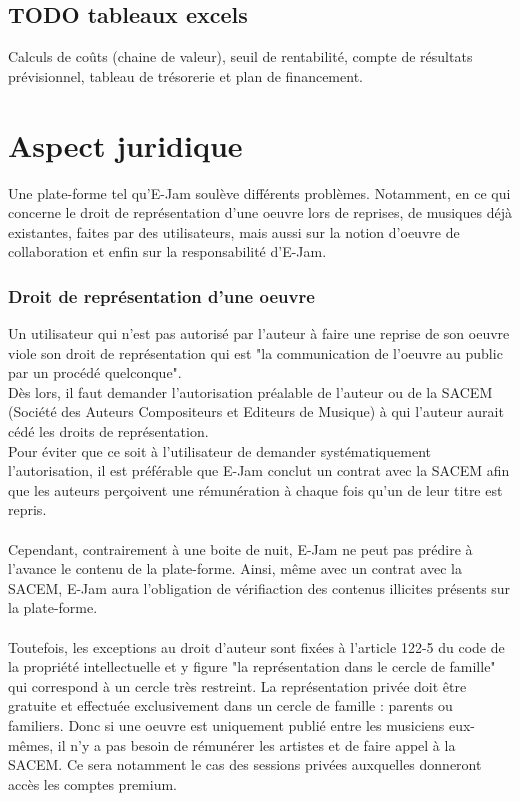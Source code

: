 \documentclass[a4,12pt]{article}
\begin{document}
\subsection{TODO tableaux excels}

Calculs de coûts (chaine de valeur), seuil de rentabilité, compte de résultats prévisionnel, tableau de trésorerie et plan de financement.\\

\section{Aspect juridique}
Une plate-forme tel qu'E-Jam soulève différents problèmes. Notamment, en ce qui concerne le droit de représentation d'une oeuvre lors de reprises, de musiques déjà existantes, faites par des utilisateurs, mais aussi sur la notion d'oeuvre de collaboration et enfin sur la responsabilité d'E-Jam.
\subsubsection{Droit de représentation d'une oeuvre}
Un utilisateur qui n'est pas autorisé par l'auteur à faire une reprise de son oeuvre viole son droit de représentation qui est "la communication de l'oeuvre au public par un procédé quelconque".\\
Dès lors, il faut demander l'autorisation préalable de l'auteur ou de la SACEM (Société des Auteurs Compositeurs et Editeurs de Musique) à qui l'auteur aurait cédé les droits de représentation.\\
Pour éviter que ce soit à l'utilisateur de demander systématiquement l'autorisation, il est préférable que E-Jam conclut un contrat avec la SACEM afin que les auteurs perçoivent une rémunération à chaque fois qu'un de leur titre est repris.\\
\\
Cependant, contrairement à une boite de nuit, E-Jam ne peut pas prédire à l'avance le contenu de la plate-forme. Ainsi, même avec un contrat avec la SACEM, E-Jam aura l'obligation de vérifiaction des contenus illicites présents sur la plate-forme.\\
\\
Toutefois, les exceptions au droit d'auteur sont fixées à l'article 122-5 du code de la propriété intellectuelle et y figure "la représentation dans le cercle de famille" qui correspond à un cercle très restreint. La représentation privée doit être gratuite et effectuée exclusivement dans un cercle de famille : parents ou familiers. Donc si une oeuvre est uniquement publié entre les musiciens eux-mêmes, il n'y a pas besoin de rémunérer les artistes et de faire appel à la SACEM. Ce sera notamment le cas des sessions privées auxquelles donneront accès les comptes premium.
\end{document}
